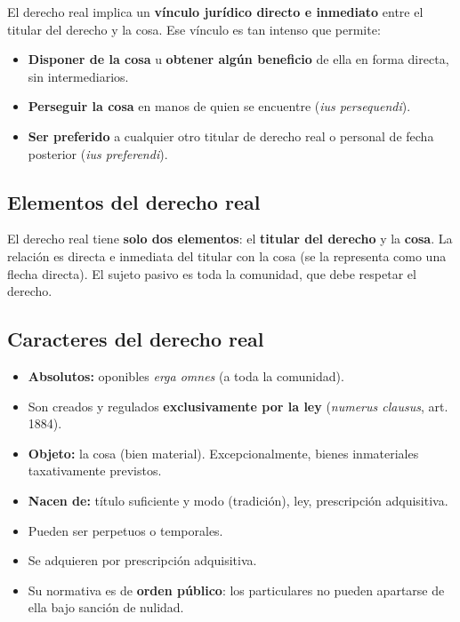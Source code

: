 \documentclass[12pt,oneside]{book}
\begin{document}
El derecho real implica un \textbf{v\'inculo jur\'idico directo e inmediato} entre el titular del derecho y la cosa. Ese v\'inculo es tan intenso que permite:

\begin{itemize}
    \item \textbf{Disponer de la cosa} u \textbf{obtener alg\'un beneficio} de ella en forma directa, sin intermediarios.
    \item \textbf{Perseguir la cosa} en manos de quien se encuentre (\textit{ius persequendi}).
    \item \textbf{Ser preferido} a cualquier otro titular de derecho real o personal de fecha posterior (\textit{ius preferendi}).
\end{itemize}

\subsection{Elementos del derecho real}

El derecho real tiene \textbf{solo dos elementos}: el \textbf{titular del derecho} y la \textbf{cosa}. La relaci\'on es directa e inmediata del titular con la cosa (se la representa como una flecha directa). El sujeto pasivo es toda la comunidad, que debe respetar el derecho.

\subsection{Caracteres del derecho real}

\begin{itemize}
    \item \textbf{Absolutos:} oponibles \textit{erga omnes} (a toda la comunidad).
    \item Son creados y regulados \textbf{exclusivamente por la ley} (\textit{numerus clausus}, art. 1884).
    \item \textbf{Objeto:} la cosa (bien material). Excepcionalmente, bienes inmateriales taxativamente previstos.
    \item \textbf{Nacen de:} t\'itulo suficiente y modo (tradici\'on), ley, prescripci\'on adquisitiva.
    \item Pueden ser perpetuos o temporales.
    \item Se adquieren por prescripci\'on adquisitiva.
    \item Su normativa es de \textbf{orden p\'ublico}: los particulares no pueden apartarse de ella bajo sanci\'on de nulidad.
\end{itemize}
\end{document}
